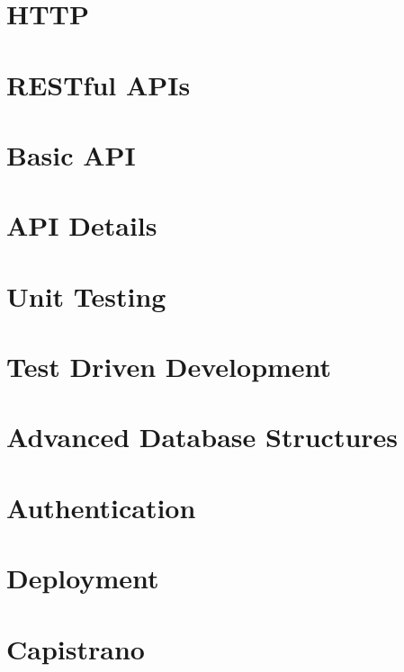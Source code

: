 \documentclass[b5paper,openany]{book}
\begin{document}
\tp


\tableofcontents



\chapter{HTTP}


\chapter{RESTful APIs}


\chapter{Basic API}


\chapter{API Details}


\chapter{Unit Testing}


\chapter{Test Driven Development}


\chapter{Advanced Database Structures}


\chapter{Authentication}


\chapter{Deployment}


\chapter{Capistrano}






\end{document}
